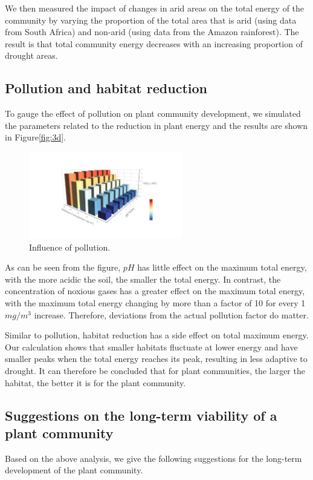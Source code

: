 \documentclass[12pt]{article}  %
\begin{document}
We then measured the impact of changes in arid areas on the total energy of the community by varying the proportion of the total area that is arid (using data from South Africa) and non-arid (using data from the Amazon rainforest). The result is that total community energy decreases with an increasing proportion of drought areas.
\vspace{-0.5cm}
\subsection{Pollution and habitat reduction}
To gauge the effect of pollution on plant community development, we simulated the parameters related to the reduction in plant energy and the results are shown in Figure\eqref{fig:3d}.
\vspace{0.1cm}
\begin{figure}[htbp]
	\centering
	\includegraphics[width=0.6\textwidth]{easymcm/img/3d.pdf}
	\caption{Influence of pollution.}
 \label{fig:3d}
\end{figure}
\vspace{-0.3cm}
As can be seen from the figure, $pH$ has little effect on the maximum total energy, with the more acidic the soil, the smaller the total energy. In contrast, the concentration of noxious gases has a greater effect on the maximum total energy, with the maximum total energy changing by more than a factor of 10 for every 1 $mg/m^3$ increase. Therefore, deviations from the actual pollution factor do matter.

Similar to pollution, habitat reduction has a side effect on total maximum energy. Our calculation shows that smaller habitats fluctuate at lower energy and have smaller peaks when the total energy reaches its peak, resulting in less adaptive to drought. It can therefore be concluded that for plant communities, the larger the habitat, the better it is for the plant community.

\vspace{-0.5cm}
\subsection{Suggestions on the long-term viability of a plant community}
\vspace{-0.2cm}
Based on the above analysis, we give the following suggestions for the long-term development of the plant community.
\end{document}
